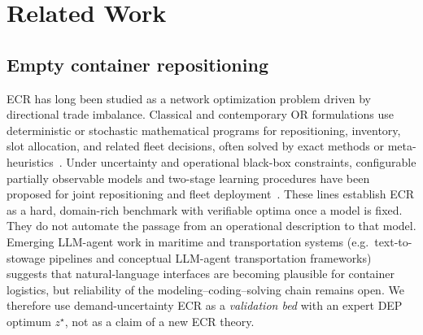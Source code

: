\documentclass[a4paper,fleqn]{cas-sc}
\begin{document}
\section{Related Work}
\label{sec:related}

\subsection{Empty container repositioning}
\label{sec:related_ecr}
ECR has long been studied as a network optimization problem driven by
directional trade imbalance. Classical and contemporary OR formulations
use deterministic or stochastic mathematical programs for repositioning,
inventory, slot allocation, and related fleet decisions, often solved by
exact methods or meta-heuristics~\citep{wang2025ecrslot,cai2025ecrjoint}.
Under uncertainty and operational black-box constraints, configurable
partially observable models and two-stage learning procedures have been
proposed for joint repositioning and fleet
deployment~\citep{poiani2024ecr}. These lines establish ECR as a hard,
domain-rich benchmark with verifiable optima once a model is fixed. They
do not automate the passage from an operational description to that model.
Emerging LLM-agent work in maritime and transportation systems (e.g.\
text-to-stowage pipelines and conceptual LLM-agent transportation
frameworks)~\citep{liu2025llmtransport} suggests that natural-language
interfaces are becoming plausible for container logistics, but reliability
of the modeling--coding--solving chain remains open. We therefore use
demand-uncertainty ECR as a \emph{validation bed} with an expert DEP
optimum $z^{\star}$, not as a claim of a new ECR theory.
\end{document}
